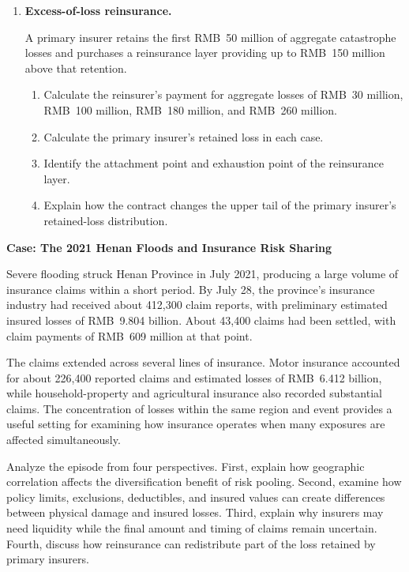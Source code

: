 \begin{enumerate}
\item \textbf{Excess-of-loss reinsurance.}

A primary insurer retains the first RMB~50 million of aggregate catastrophe losses and purchases a reinsurance layer providing up to RMB~150 million above that retention.

\begin{enumerate}

\item Calculate the reinsurer's payment for aggregate losses of RMB~30 million, RMB~100 million, RMB~180 million, and RMB~260 million.

\item Calculate the primary insurer's retained loss in each case.

\item Identify the attachment point and exhaustion point of the reinsurance layer.

\item Explain how the contract changes the upper tail of the primary insurer's retained-loss distribution.

\end{enumerate}

\end{enumerate}




\textbf{Case: The 2021 Henan Floods and Insurance Risk Sharing}

Severe flooding struck Henan Province in July 2021, producing a large volume of insurance claims within a short period. By July 28, the province's insurance industry had received about 412,300 claim reports, with preliminary estimated insured losses of RMB~9.804 billion. About 43,400 claims had been settled, with claim payments of RMB~609 million at that point.

The claims extended across several lines of insurance. Motor insurance accounted for about 226,400 reported claims and estimated losses of RMB~6.412 billion, while household-property and agricultural insurance also recorded substantial claims. The concentration of losses within the same region and event provides a useful setting for examining how insurance operates when many exposures are affected simultaneously.

Analyze the episode from four perspectives. First, explain how geographic correlation affects the diversification benefit of risk pooling. Second, examine how policy limits, exclusions, deductibles, and insured values can create differences between physical damage and insured losses. Third, explain why insurers may need liquidity while the final amount and timing of claims remain uncertain. Fourth, discuss how reinsurance can redistribute part of the loss retained by primary insurers.

